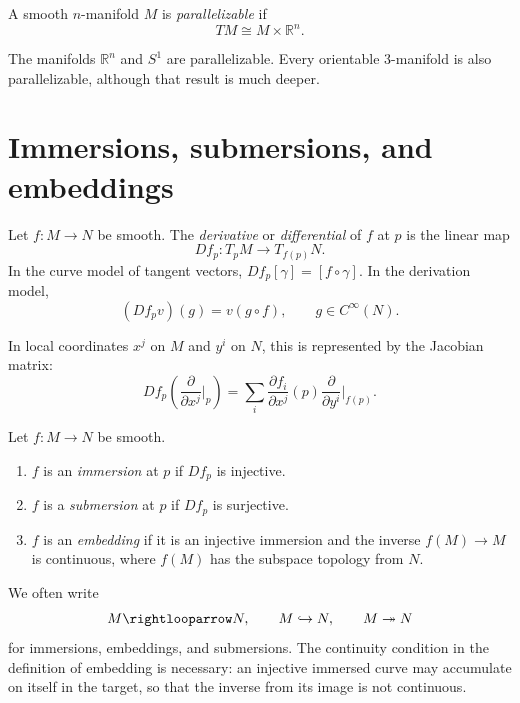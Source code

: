\begin{definition}
\label{definition-parallelizable}
A smooth $n$-manifold $M$ is
{\it parallelizable} if
$$
TM\cong M\times \mathbb R^n.
$$
\end{definition}

\begin{example}
\label{example-parallelizable-manifolds}
The manifolds $\mathbb R^n$ and $S^1$ are
parallelizable.  Every orientable
3-manifold is also parallelizable, although
that result is much deeper.
\end{example}

\section{Immersions, submersions, and embeddings}
\label{section-immersions-submersions-embeddings}

\begin{definition}
\label{definition-differential-map}
Let $f:M\to N$ be smooth.  The
{\it derivative} or {\it differential} of
$f$ at $p$ is the linear map
$$
Df_p:T_pM\to T_{f(p)}N.
$$
In the curve model of tangent vectors,
$Df_p[\gamma]=[f\circ\gamma]$.  In the
derivation model,
$$
(Df_pv)(g)=v(g\circ f),
\qquad g\in C^\infty(N).
$$
\end{definition}

\noindent
In local coordinates $x^j$ on $M$ and $y^i$
on $N$, this is represented by the Jacobian
matrix:
$$
Df_p
\left(\frac{\partial}{\partial x^j}\Big|_p
\right)
=
\sum_i
\frac{\partial f_i}{\partial x^j}(p)
\frac{\partial}{\partial y^i}\Big|_{f(p)}.
$$

\begin{definition}
\label{definition-immersion-submersion-embedding}
Let $f:M\to N$ be smooth.
\begin{enumerate}
\item $f$ is an {\it immersion} at $p$ if
$Df_p$ is injective.

\item $f$ is a {\it submersion} at $p$ if
$Df_p$ is surjective.

\item $f$ is an {\it embedding} if it is an
injective immersion and the inverse
$f(M)\to M$ is continuous, where $f(M)$ has
the subspace topology from $N$.
\end{enumerate}
\end{definition}

\noindent
We often write
$$
M\rightlooparrow N,
\qquad
M\hookrightarrow N,
\qquad
M\twoheadrightarrow N
$$
for immersions, embeddings, and submersions.
The continuity condition in the definition of
embedding is necessary: an injective immersed
curve may accumulate on itself in the target,
so that the inverse from its image is not
continuous.

